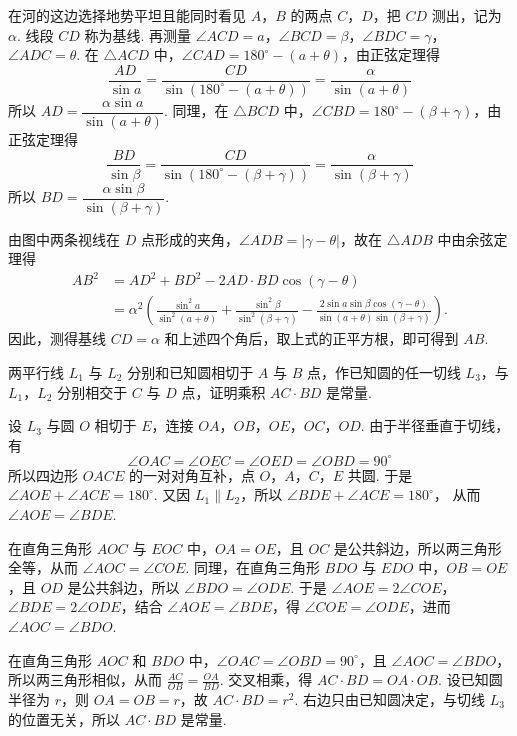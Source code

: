 \begin{solution}
在河的这边选择地势平坦且能同时看见 \(A\)，\(B\) 的两点 \(C\)，\(D\)，把 \(CD\) 测出，记为 \(\alpha\). 线段 \(CD\) 称为基线. 再测量 \(\angle ACD=a\)，\(\angle BCD=\beta\)，\(\angle BDC=\gamma\)，\(\angle ADC=\theta\).
在 \(\triangle ACD\) 中，\(\angle CAD=180^{\circ}-(a+\theta)\)，由正弦定理得
\[
\frac{AD}{\sin a}=\frac{CD}{\sin\left(180^{\circ}-(a+\theta)\right)}=\frac{\alpha}{\sin(a+\theta)}
\]
所以 \(AD=\dfrac{\alpha\sin a}{\sin(a+\theta)}\). 同理，在 \(\triangle BCD\) 中，\(\angle CBD=180^{\circ}-(\beta+\gamma)\)，由正弦定理得
\[
\frac{BD}{\sin\beta}=\frac{CD}{\sin\left(180^{\circ}-(\beta+\gamma)\right)}=\frac{\alpha}{\sin(\beta+\gamma)}
\]
所以 \(BD=\dfrac{\alpha\sin\beta}{\sin(\beta+\gamma)}\).

由图中两条视线在 \(D\) 点形成的夹角，\(\angle ADB=\left|\gamma-\theta\right|\)，故在 \(\triangle ADB\) 中由余弦定理得
\[
\begin{aligned}
AB^{2}&=AD^{2}+BD^{2}-2AD\cdot BD\cos\left(\gamma-\theta\right)\\
&=\alpha^{2}\left(\frac{\sin^{2}a}{\sin^{2}(a+\theta)}+\frac{\sin^{2}\beta}{\sin^{2}(\beta+\gamma)}-\frac{2\sin a\sin\beta\cos\left(\gamma-\theta\right)}{\sin(a+\theta)\sin(\beta+\gamma)}\right).
\end{aligned}
\]
因此，测得基线 \(CD=\alpha\) 和上述四个角后，取上式的正平方根，即可得到 \(AB\).
\end{solution}

\begin{problem}
两平行线 \(L_{1}\) 与 \(L_{2}\) 分别和已知圆相切于 \(A\) 与 \(B\) 点，作已知圆的任一切线 \(L_{3}\)，与 \(L_{1}\)，\(L_{2}\) 分别相交于 \(C\) 与 \(D\) 点，证明乘积 \(AC\cdot BD\) 是常量.
\end{problem}

\begin{solution}
设 \(L_{3}\) 与圆 \(O\) 相切于 \(E\)，连接 \(OA\)，\(OB\)，\(OE\)，\(OC\)，\(OD\). 由于半径垂直于切线，有
\[
\angle OAC=\angle OEC=\angle OED=\angle OBD=90^{\circ}
\]
所以四边形 \(OACE\) 的一对对角互补，点 \(O\)，\(A\)，\(C\)，\(E\) 共圆. 于是 \(\angle AOE+\angle ACE=180^{\circ}\). 又因 \(L_{1}\parallel L_{2}\)，所以 \(\angle BDE+\angle ACE=180^{\circ}\)，
从而 \(\angle AOE=\angle BDE\).

在直角三角形 \(AOC\) 与 \(EOC\) 中，\(OA=OE\)，且 \(OC\) 是公共斜边，所以两三角形全等，从而 \(\angle AOC=\angle COE\). 同理，在直角三角形 \(BDO\) 与 \(EDO\) 中，\(OB=OE\)，且 \(OD\) 是公共斜边，所以 \(\angle BDO=\angle ODE\). 于是 \(\angle AOE=2\angle COE\)，\(\angle BDE=2\angle ODE\)，结合 \(\angle AOE=\angle BDE\)，得 \(\angle COE=\angle ODE\)，进而 \(\angle AOC=\angle BDO\).

在直角三角形 \(AOC\) 和 \(BDO\) 中，\(\angle OAC=\angle OBD=90^{\circ}\)，且 \(\angle AOC=\angle BDO\)，所以两三角形相似，从而 \(\frac{AC}{OB}=\frac{OA}{BD}\). 交叉相乘，得 \(AC\cdot BD=OA\cdot OB\). 设已知圆半径为 \(r\)，则 \(OA=OB=r\)，故 \(AC\cdot BD=r^{2}\).
右边只由已知圆决定，与切线 \(L_{3}\) 的位置无关，所以 \(AC\cdot BD\) 是常量.
\end{solution}

